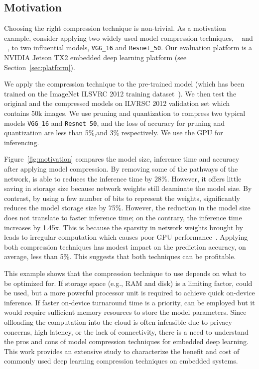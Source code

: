 \subsection{Motivation}
Choosing the right compression technique is non-trivial. As a motivation example, consider applying two widely used model compression
techniques, \pruning~\cite{manessi2017automated} and \dquantization~\cite{han2015deep}, to two influential \CNN models, \texttt{VGG\_16} 	and
\texttt{Resnet\_50}. Our evaluation platform is a NVIDIA Jetson TX2 embedded deep learning platform (see Section~\ref{sec:platform}).

 We apply the compression technique to the pre-trained model (which has been trained on the ImageNet ILSVRC 2012
training dataset~\cite{imagenet2012}). We then test the original and the compressed models on ILVRSC 2012 validation set which contains 50k images.
We use pruning and quantization to compress two typical models \texttt{VGG\_16} and \texttt{Resnet 50}, 
and the loss of accuracy for pruning and quantization are less than 5\%,and 3\% respectively.
We use the GPU for
inferencing.

 Figure~\ref{fig:motivation} compares the model size, inference time and accuracy after applying model
compression. By removing some of the pathways of the network, \pruning is able to reduces the inference time by 28\%. However, it offers
little saving in storage size because network weights still deaminate the model size. By contrast, by using a few number of bits to
represent the weights, \quantization significantly reduces the model storage size by 75\%. However, the reduction in the model size does
not translate to faster inference time; on the contrary, the inference time increases by 1.45x. This is because the sparsity in network
weights brought by \quantization leads to irregular computation which causes poor GPU performance~\cite{}. Applying both compression
techniques has modest impact on the prediction accuracy, on average, less than 5\%. This suggests that both techniques can be profitable.

 This example shows that the compression technique to use depends on what to be optimized for. If storage
space (e.g., RAM and disk) is a limiting factor, \quantization could be used, but a more powerful processor unit is required to achieve
quick on-device inference. If faster on-device turnaround time is a priority, \pruning can be employed but it would require sufficient
memory resources to store the model parameters.  Since offloading the computation into the cloud is often infeasible due to privacy
concerns, high latency, or the lack of connectivity, there is a need to understand the pros and cons of model compression techniques for
embedded deep learning. This work provides an extensive study to characterize the benefit and cost of commonly used deep learning
compression techniques on embedded systems.
